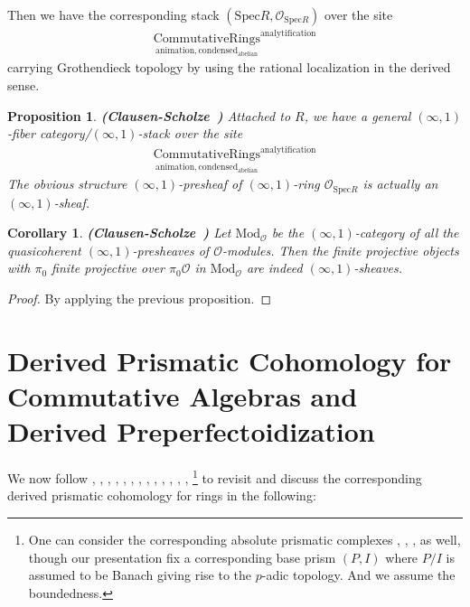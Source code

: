 \documentclass[12pt]{book}
\newtheorem{proposition}{Proposition}
\newtheorem{corollary}{Corollary}
\begin{document}
Then we have the corresponding stack $(\mathrm{Spec}R,\mathcal{O}_{\mathrm{Spec}R})$ over the site 
\begin{align}
{\underset{\mathrm{animation},\mathrm{condensed}_\mathrm{abelian}}{\mathrm{CommutativeRings}}}^{\mathrm{analytification}}
\end{align}
carrying Grothendieck topology by using the rational localization in the derived sense.

\begin{proposition} \mbox{\textbf{(Clausen-Scholze \cite[Proposition 12.18, Proposition 14.2, Proposition 14.7]{CS2})}}
Attached to $R$, we have a general $(\infty,1)$-fiber category/$(\infty,1)$-stack over the site 
\begin{align}
{\underset{\mathrm{animation},\mathrm{condensed}_\mathrm{abelian}}{\mathrm{CommutativeRings}}}^{\mathrm{analytification}}
\end{align}
The obvious structure $(\infty,1)$-presheaf of $(\infty,1)$-ring $\mathcal{O}_{\mathrm{Spec}R}$ is actually an $(\infty,1)$-sheaf. 
\end{proposition}

\begin{corollary} \mbox{\textbf{(Clausen-Scholze \cite[Remark 14.10]{CS2})}}
Let $\mathrm{Mod}_\mathcal{O}$ be the $(\infty,1)$-category of all the quasicoherent $(\infty,1)$-presheaves of $\mathcal{O}$-modules. Then the finite projective objects with $\pi_0$ finite projective over $\pi_0\mathcal{O}$ in $\mathrm{Mod}_\mathcal{O}$ are indeed $(\infty,1)$-sheaves.
\end{corollary}

\begin{proof}
By applying the previous proposition.
\end{proof}



\chapter{Derived Prismatic Cohomology for Commutative Algebras and Derived Preperfectoidization}


We now follow \cite{Grot1}, \cite{Grot2}, \cite{Grot3}, \cite{Grot4}, \cite{BK}, \cite{BBK}, \cite{BBBK}, \cite{BBM}, \cite{KKM}, \cite{T2}, \cite{Sch2}, \cite{BS}, \cite{BL}, \cite{Dr1}\footnote{One can consider the corresponding absolute prismatic complexes \cite{BS}, \cite{BL2}, \cite{BL}, \cite{Dr1} as well, though our presentation fix a corresponding base prism $(P,I)$ where $P/I$ is assumed to be Banach giving rise to the $p$-adic topology. And we assume the boundedness. } to revisit and discuss the corresponding derived prismatic cohomology for rings in the following:
\end{document}
